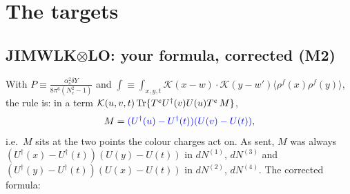 \documentclass[10pt]{article}
\numberwithin{equation}{section}
\newcommand{\new}[1]{{\color{blue}#1}}
\newcommand{\old}[1]{{\color{red}#1}}
\begin{document}
\section{The targets}\label{sec:targets}
\subsection{JIMWLK$\otimes$LO: your formula, corrected (M2)}
With $P\equiv\frac{\alpha_s^2\delta Y}{8\pi^6(N_c^2-1)}$ and $\int\equiv\int_{x,y,t}\mathcal K(x-w)\cdot\mathcal K(y-w')\langle\rho^f(x)\rho^f(y)\rangle$, the rule is: in a term $\mathcal K(u,v,t)\,{\rm Tr}\{T^eU^\dagger(v)U(u)T^e\,M\}$,
\begin{equation*}
M=\new{(U^\dagger(u)-U^\dagger(t))(U(v)-U(t))},
\end{equation*}
i.e.\ $M$ sits at the two points the colour charges act on. As sent, $M$ was always \old{$(U^\dagger(x)-U^\dagger(t))(U(y)-U(t))$} in $dN^{(1)}$, $dN^{(3)}$ and \old{$(U^\dagger(y)-U^\dagger(t))(U(x)-U(t))$} in $dN^{(2)}$, $dN^{(4)}$. The corrected formula:
\end{document}
